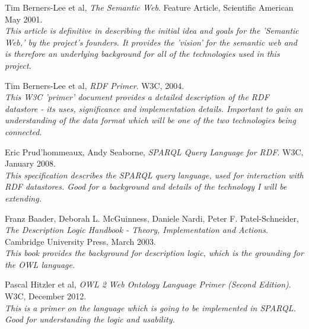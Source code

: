 \documentclass{article}
\begin{document}
\begin{thebibliography}{9}

  Tim Berners-Lee et al,
  \emph{The Semantic Web}.
  Feature Article, Scientific American
  May 2001.
    \\  
    \emph{This article is definitive in describing the initial idea and goals for the
    'Semantic Web,' by the project's founders. It provides the 'vision' for the
    semantic web and is therefore an underlying background for all of the
    technologies used in this project.}

 Tim Berners-Lee et al,
 \emph{RDF Primer}.
 W3C,
 2004.
   \\ 
   \emph{This W3C 'primer' document provides a detailed description of the RDF
   datastore - its uses, significance and implementation details. Important to
   gain an understanding of the data format which will be one of the two
   technologies being connected.}

  Eric Prud'hommeaux, Andy Seaborne,
  \emph{SPARQL Query Language for RDF}.
  W3C,
  January 2008.
    \\ 
    \emph{This specification describes the SPARQL query language, used for
    interaction with RDF datastores. Good for a background and details of 
    the technology I will be extending.}

 Franz Baader, Deborah L. McGuinness, Daniele Nardi, Peter F. Patel-Schneider,
 \emph{The Description Logic Handbook - Theory, Implementation and Actions}.
 Cambridge University Press,
 March 2003.
   \\ 
   \emph{This book provides the background for description logic, which is the
   grounding for the OWL language.}

  Pascal Hitzler et al,
  \emph{OWL 2 Web Ontology Language Primer (Second Edition)}.
  W3C,
  December 2012.
  \\ 
  \emph{This is a primer on the language which is going to be implemented in
  SPARQL. Good for understanding the logic and usability.}

\end{thebibliography}
\end{document}
